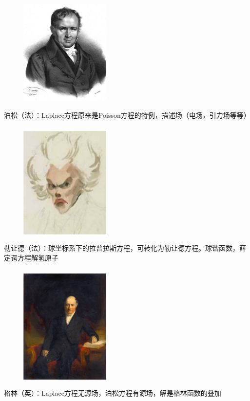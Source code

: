 \begin{frame}
	\frametitle{}
	\begin{center}
		\begin{figure}
			\includegraphics[width=4.5cm]{figs/fig1-3-4.png}	
		\end{figure}
	\end{center}
		{泊松（法）：Laplace方程原来是Poisson方程的特例，描述场（电场，引力场等等）}
\end{frame}

\begin{frame}
	\frametitle{}
	\begin{center}
		\begin{figure}
			\includegraphics[width=4.5cm]{figs/fig1-3-5.png}	
		\end{figure}
	\end{center}
		{勒让德（法）：球坐标系下的拉普拉斯方程，可转化为勒让德方程。球谐函数，薛定谔方程解氢原子}
\end{frame}

\begin{frame}
	\frametitle{}
	\begin{center}
		\begin{figure}
			\includegraphics[width=4.5cm]{figs/fig1-3-2.png}	
		\end{figure}
	\end{center}
		{格林（英）：Laplace方程无源场，泊松方程有源场，解是格林函数的叠加}
\end{frame}


